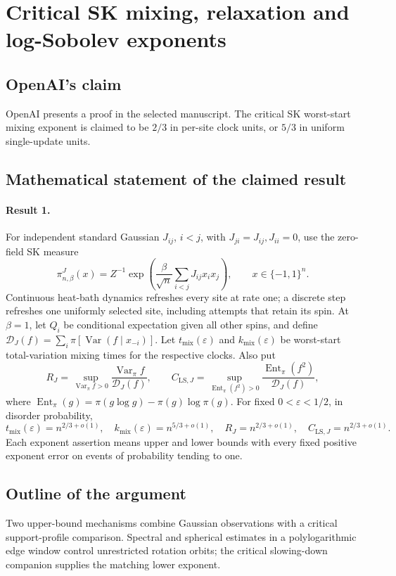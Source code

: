 \documentclass[11pt]{article}
\begin{document}
\section*{Critical SK mixing, relaxation and log-Sobolev exponents}

\subsection{OpenAI's claim}
OpenAI presents a proof in the selected manuscript. The critical SK worst-start mixing exponent is claimed to be $2/3$ in per-site clock units, or $5/3$ in uniform single-update units.

\subsection{Mathematical statement of the claimed result}
\paragraph{Result 1.} For independent standard Gaussian $J_{ij}$, $i<j$, with $J_{ji}=J_{ij},J_{ii}=0$, use the zero-field SK measure
\[
 \pi_{n,\beta}^J(x)=Z^{-1}\exp\left(\frac\beta{\sqrt n}\sum_{i<j}J_{ij}x_ix_j\right),\qquad x\in\{-1,1\}^n.
\]
Continuous heat-bath dynamics refreshes every site at rate one; a discrete step refreshes one uniformly selected site, including attempts that retain its spin. At $\beta=1$, let $Q_i$ be conditional expectation given all other spins, and define $\mathcal D_J(f)=\sum_i\pi[\operatorname{Var}(f\mid x_{-i})]$. Let $t_{\mathrm{mix}}(\varepsilon)$ and $k_{\mathrm{mix}}(\varepsilon)$ be worst-start total-variation mixing times for the respective clocks. Also put
\[
 R_J=\sup_{\operatorname{Var}_\pi f>0}\frac{\operatorname{Var}_\pi f}{\mathcal D_J(f)},\qquad
 C_{\mathrm{LS},J}=\sup_{\operatorname{Ent}_\pi(f^2)>0}\frac{\operatorname{Ent}_\pi(f^2)}{\mathcal D_J(f)},
\]
where $\operatorname{Ent}_\pi(g)=\pi(g\log g)-\pi(g)\log\pi(g)$. For fixed $0<\varepsilon<1/2$, in disorder probability,
\[
 t_{\mathrm{mix}}(\varepsilon)=n^{2/3+o(1)},\quad
 k_{\mathrm{mix}}(\varepsilon)=n^{5/3+o(1)},\quad R_J=n^{2/3+o(1)},\quad C_{\mathrm{LS},J}=n^{2/3+o(1)}.
\]
Each exponent assertion means upper and lower bounds with every fixed positive exponent error on events of probability tending to one.

\subsection{Outline of the argument}
Two upper-bound mechanisms combine Gaussian observations with a critical support-profile comparison. Spectral and spherical estimates in a polylogarithmic edge window control unrestricted rotation orbits; the critical slowing-down companion supplies the matching lower exponent.
\end{document}
